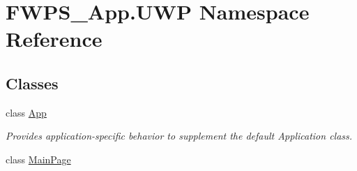 \hypertarget{namespace_f_w_p_s___app_1_1_u_w_p}{}\section{F\+W\+P\+S\+\_\+\+App.\+U\+WP Namespace Reference}
\label{namespace_f_w_p_s___app_1_1_u_w_p}
\subsection*{Classes}
\begin{DoxyCompactItemize}
\item 
class \mbox{\hyperlink{class_f_w_p_s___app_1_1_u_w_p_1_1_app}{App}}
\begin{DoxyCompactList}\small\item\em Provides application-\/specific behavior to supplement the default Application class. \end{DoxyCompactList}\item 
class \mbox{\hyperlink{class_f_w_p_s___app_1_1_u_w_p_1_1_main_page}{Main\+Page}}
\end{DoxyCompactItemize}
